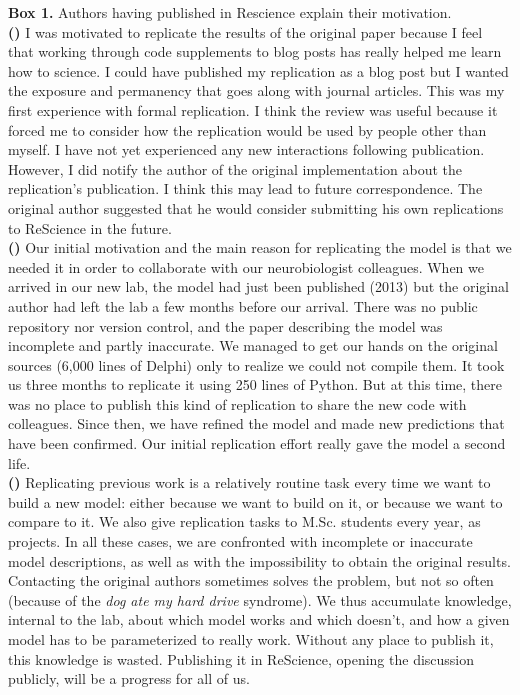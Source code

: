 \documentclass[a4paper,10pt, twocolumn]{article}
\begin{document}
\begin{tcolorbox}[breakable, pad at break*=1mm,
                  colback=black!2.5, arc=0pt, outer arc=0pt, boxrule=.25pt]
\begin{footnotesize}
\textbf{Box 1.} Authors having  published in Rescience explain their motivation.\\

\textbf{(\cite{stachelek:2016})} I was motivated to replicate the results of
the original paper because I feel that working through code supplements to blog
posts has really helped me learn how to science. I could have published my
replication as a blog post but I wanted the exposure and permanency that goes
along with journal articles. This was my first experience with formal
replication. I think the review was useful because it forced me to consider how
the replication would be used by people other than myself. I have not yet
experienced any new interactions following publication. However, I did notify
the author of the original implementation about the replication's
publication. I think this may lead to future correspondence. The original
author suggested that he would consider submitting his own replications to
ReScience in the future.\\

\textbf{(\cite{topalidou:2015b})} Our initial motivation and the main reason
for replicating the model is that we needed it in order to collaborate with our
neurobiologist colleagues. When we arrived in our new lab, the model had just
been published (2013) but the original author had left the lab a few months before
our arrival. There was no public repository nor version control, and the paper
describing the model was incomplete and partly inaccurate. We managed to get
our hands on the original sources (6,000 lines of Delphi) only to realize we
could not compile them. It took us three months to replicate it using 250 lines
of Python. But at this time, there was no place to publish this kind of
replication to share the new code with colleagues. Since then, we have refined
the model and made new predictions that have been confirmed. Our initial
replication effort really gave the model a second life.\\

\textbf{(\cite{viejo:2016})} Replicating previous work is a relatively routine
task every time we want to build a new model: either because we want to build
on it, or because we want to compare to it. We also give replication tasks to
M.Sc. students every year, as projects. In all these cases, we are confronted
with incomplete or inaccurate model descriptions, as well as with the impossibility
to obtain the original results. Contacting the original authors sometimes
solves the problem, but not so often (because of the {\em dog ate my hard
  drive} syndrome). We thus accumulate knowledge, internal to the lab, about
which model works and which doesn't, and how a given model has to be parameterized
to really work. Without any place to publish it, this knowledge is
wasted. Publishing it in ReScience, opening the discussion publicly, will be a
progress for all of us. \par
\end{footnotesize}
\end{tcolorbox}
\end{document}
